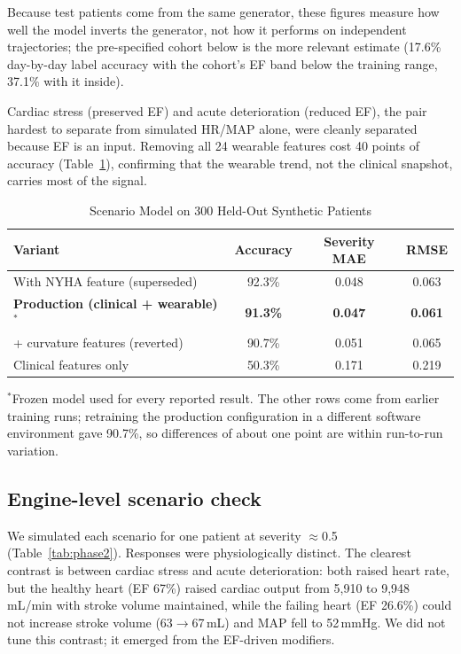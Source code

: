 \documentclass[conference]{IEEEtran}
\begin{document}
Because test patients come from the same generator, these figures measure how well the model inverts the generator, not how it performs on independent trajectories; the pre-specified cohort below is the more relevant estimate (17.6\% day-by-day label accuracy with the cohort's EF band below the training range, 37.1\% with it inside).

Cardiac stress (preserved EF) and acute deterioration (reduced EF), the pair hardest to separate from simulated HR/MAP alone, were cleanly separated because EF is an input. Removing all 24 wearable features cost 40 points of accuracy (Table~\ref{tab:ablation}), confirming that the wearable trend, not the clinical snapshot, carries most of the signal.

\begin{table}[!t]
\centering
\setlength{\tabcolsep}{4pt}\caption{Scenario Model on 300 Held-Out Synthetic Patients}
\label{tab:ablation}
\footnotesize
\begin{tabular}{@{}lccc@{}}
\toprule
\textbf{Variant} & \textbf{Accuracy} & \textbf{Severity MAE} & \textbf{RMSE} \\
\midrule
With NYHA feature (superseded) & 92.3\% & 0.048 & 0.063 \\
\textbf{Production (clinical + wearable)}$^{*}$ & \textbf{91.3\%} & \textbf{0.047} & \textbf{0.061} \\
+ curvature features (reverted) & 90.7\% & 0.051 & 0.065 \\
Clinical features only & 50.3\% & 0.171 & 0.219 \\
\bottomrule
\end{tabular}
\par\smallskip\raggedright\scriptsize $^{*}$Frozen model used for every reported result. The other rows come from earlier training runs; retraining the production configuration in a different software environment gave 90.7\%, so differences of about one point are within run-to-run variation.
\end{table}

\subsection{Engine-level scenario check}\label{sec:enginecheck}
We simulated each scenario for one patient at severity $\approx$0.5 (Table~\ref{tab:phase2}). Responses were physiologically distinct. The clearest contrast is between cardiac stress and acute deterioration: both raised heart rate, but the healthy heart (EF 67\%) raised cardiac output from 5,910 to 9,948\,mL/min with stroke volume maintained, while the failing heart (EF 26.6\%) could not increase stroke volume (63$\rightarrow$67\,mL) and MAP fell to 52\,mmHg. We did not tune this contrast; it emerged from the EF-driven modifiers.
\end{document}

